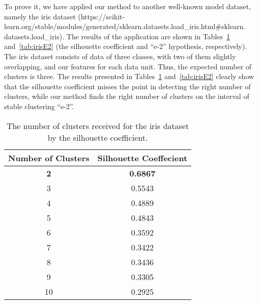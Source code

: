 To prove it, we have applied our method to another well-known model dataset, namely the iris dataset (https://scikit-learn.org/stable/modules/generated/sklearn.datasets.load\_iris.html\#sklearn. datasets.load\_iris). The results of the application are shown in Tables~\cref{tab:irisSilhouetteCoefficient} and~\cref{tab:irisE2} (the silhouette coefficient and “e-2” hypothesis, respectively). The iris dataset consists of data of three classes, with two of them slightly overlapping, and our features for each data unit. Thus, the expected number of clusters is three. The results presented in Tables~\cref{tab:irisSilhouetteCoefficient} and~\cref{tab:irisE2} clearly show that the silhouette coefficient misses the point in detecting the right number of clusters, while our method finds the right number of clusters on the interval of stable clustering “e-2”.

\begin{table}[ht]%
	\centering
	\caption{The number of clusters received for the iris dataset by the silhouette coefficient.}%
	\label{tab:irisSilhouetteCoefficient}%
		\begin{tabular}{ c  c }%
			\toprule
			Number of Clusters & Silhouette Coeffecient\\
			\hline
			\textbf{2} & \textbf{0.6867} \\
			3 & 0.5543 \\
			4 & 0.4889 \\
			5 & 0.4843 \\
			6 & 0.3592 \\
			7 & 0.3422 \\
			8 & 0.3436 \\
			9 & 0.3305 \\
			10 & 0.2925 \\			
			\bottomrule
		\end{tabular}%
\end{table}

